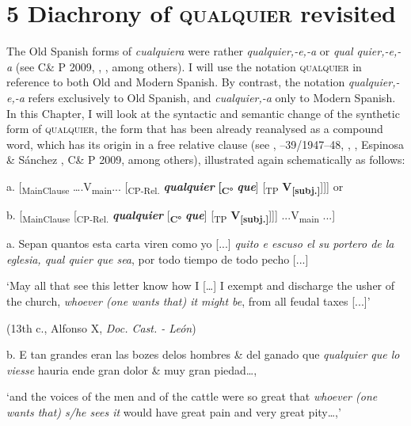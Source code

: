 \chapter{\textbf{5} \textbf{Diachrony} \textbf{of} \textbf{\textsc{qualquier} }\textbf{revisited}}

The Old Spanish forms of \textit{cualquiera} were rather \textit{qualquier,\nobreakdash-e,\nobreakdash-a} or \textit{qual quier,\nobreakdash-e,\nobreakdash-a} (see C\& P 2009, \citealt{Pato2012}, \citealt{Mackenzie2019}, among others). I will use the notation \textsc{qualquier} in reference to both Old and Modern Spanish. By contrast, the notation \textit{qualquier,\nobreakdash-e,\nobreakdash-a} refers exclusively to Old Spanish, and \textit{cualquier,-a} only to Modern Spanish. In this Chapter, I will look at the syntactic and semantic change of the synthetic form of \textsc{qualquier}, the form that has been already reanalysed as a compound word, which has its origin in a free relative clause (see \citealt{Palomo1934}, \citealt{Lombard1938}–39/1947–48, \citealt{Meier1950}, \citealt{Rivero1988}, Espinosa \& Sánchez \citealt{Lancis2006}, C\& P 2009, among others), illustrated again schematically as follows:

  a.  [\textsubscript{MainClause} ….V\textsubscript{main}... [\textsubscript{CP-Rel.} \textbf{\textit{qualquier} }\textbf{[\textsubscript{C°}} \textbf{\textit{que}}] [\textsubscript{TP} \textbf{V\textsubscript{[subj.]}}]]] or 

  b.  [\textsubscript{MainClause} [\textsubscript{CP-Rel.} \textbf{\textit{qualquier} }[\textbf{\textsubscript{C°}} \textbf{\textit{que}}] [\textsubscript{TP} \textbf{V\textsubscript{[subj.]}}]]] ...V\textsubscript{main} ...]

  a.  Sepan quantos esta carta viren como yo [...] \textit{quito e escuso el su portero de la eglesia, qual quier que sea}, por todo tiempo de todo pecho [...] 

    ‘May all that see this letter know how I […] I exempt and discharge the usher of the church, \textit{whoever (one wants that) it might be}, from all feudal taxes [...]’

    (13th c., Alfonso X, \textit{Doc. Cast. - León})

  b.  E tan grandes eran las bozes delos hombres \& del ganado que \textit{qualquier que lo viesse} hauria ende gran dolor \& muy gran piedad…, 

    ‘and the voices of the men and of the cattle were so great that \textit{whoever (one wants that) s/he sees it} would have great pain and very great pity…,’

